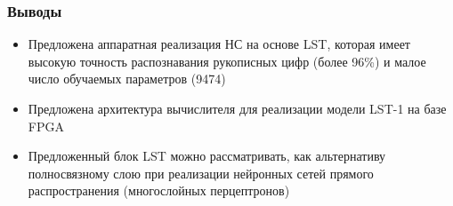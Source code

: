 \begin{frame}[t]
\frametitle{Выводы}
\begin{itemize}
    \item Предложена аппаратная реализация НС на основе LST, которая имеет высокую точность распознавания рукописных цифр (более 96\%) и малое число обучаемых параметров (9474)
    \item Предложена архитектура вычислителя для реализации модели LST-1 на базе FPGA
    \item Предложенный блок LST можно рассматривать, как альтернативу полносвязному слою при реализации нейронных сетей прямого распространения (многослойных перцептронов)
\end{itemize}
\end{frame}

